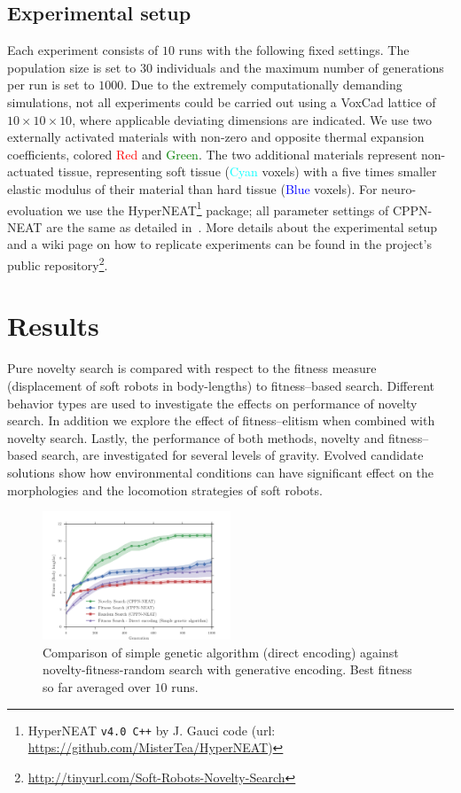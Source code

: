 \documentclass{sig-alternate}
\begin{document}
\subsection{Experimental setup}
Each experiment consists of $10$ runs with the following fixed settings. The population size is set to $30$ individuals and the maximum number of generations per run is set to $1000$. Due to the extremely computationally demanding simulations, not all experiments could be carried out using a VoxCad lattice of $10 \times 10 \times 10$, where applicable deviating dimensions are indicated. We use two externally activated materials with non-zero and opposite thermal expansion coefficients, colored \textcolor{Red}{Red} and \textcolor{Green}{Green}. The two additional materials represent non-actuated tissue, representing soft tissue (\textcolor{Cyan}{Cyan} voxels) with a five times smaller elastic modulus of their material than hard tissue (\textcolor{Blue}{Blue} voxels). %
For neuro-evoluation we use the HyperNEAT\footnote{HyperNEAT \texttt{v4.0 C++}  by J. Gauci code (url: \small{\url{ https://github.com/MisterTea/HyperNEAT})}} package; all parameter settings of CPPN-NEAT are the same as detailed in~\cite{cheney2013unshackling}. More details about the experimental setup and a wiki page on how to replicate experiments can be found in  the project's public repository\footnote{\small{\url{http://tinyurl.com/Soft-Robots-Novelty-Search}}}.


\section{Results}
Pure novelty search is compared with respect to the fitness measure (displacement of soft robots in body-lengths) to fitness--based search. Different behavior types are used to investigate the effects on performance of novelty search. In addition we explore the effect of fitness--elitism when combined with novelty search. Lastly, the performance of both methods, novelty and fitness--based search, are investigated for several levels of gravity. Evolved candidate solutions show how environmental conditions can have significant effect on the morphologies and the locomotion strategies of soft robots.


\begin{figure}[t!]
\centering
\includegraphics[width=0.5\textwidth]{../Figures/Results/FitNovRandomDirectSize5.pdf}
\caption{Comparison of simple genetic algorithm (direct encoding) against novelty-fitness-random search with generative encoding. Best fitness so far averaged over $10$ runs.}
\label{fig:FitNovRandomDirectSize5}
\end{figure}
\end{document}
